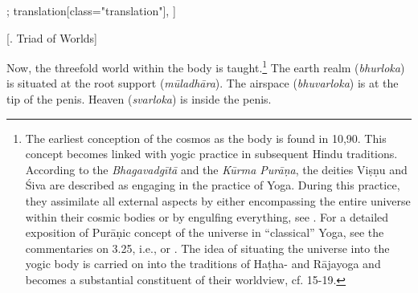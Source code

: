 \begin{alignment}[
  texts=edition[class="edition"];
  translation[class="translation"],
  ]
\begin{translation}
    \begin{tlate}
    \end{tlate}
    \begin{tlate}
\centerline{\textrm{\small{[. Triad of Worlds]}}}
\bigskip
\noindent
Now, the threefold world within the body is taught.\footnote{The earliest conception of the cosmos as the body is found in  10,90. This concept becomes linked with yogic practice in subsequent Hindu traditions. According to the \textit{Bhagavadgītā} and the \textit{Kūrma Purāṇa}, the deities Viṣṇu and Śiva are described as engaging in the practice of Yoga. During this practice, they assimilate all external aspects by either encompassing the entire universe within their cosmic bodies or by engulfing everything, see \citeauthor[2011:88]{white2011}. For a detailed exposition of Purāṇic concept of the universe in ``classical'' Yoga, see the commentaries on  3.25, i.e., \citeauthor[1983: 297-304]{aranya} or \citeauthor[2009:353-356]{bryant2009}. The idea of situating the universe into the yogic body is carried on into the traditions of Haṭha- and Rājayoga and becomes a substantial constituent of their worldview, cf.  15-19.} The earth realm (\textit{bhurloka}) is situated at the root support (\textit{mūladhāra}). The airspace (\textit{bhuvarloka}) is at the tip of the penis. Heaven (\textit{svarloka}) is inside the penis.

\end{tlate}
\end{translation}
\end{alignment}
